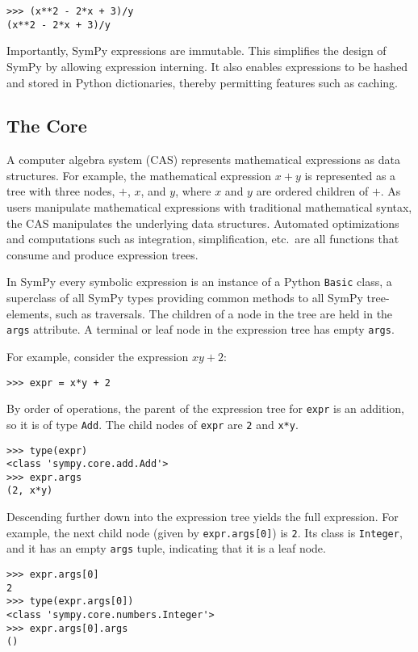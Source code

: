 \begin{verbatim}
>>> (x**2 - 2*x + 3)/y
(x**2 - 2*x + 3)/y
\end{verbatim}

Importantly, SymPy expressions are immutable. This simplifies the design of
SymPy by allowing expression interning. It also enables expressions to be
hashed and stored in Python dictionaries, thereby permitting features
such as caching.


\subsection{The Core}

A computer algebra system (CAS) represents mathematical expressions as data
structures.  For example, the mathematical expression $x + y$ is represented as
a tree with three nodes, $+$, $x$, and $y$, where $x$ and $y$ are ordered
children of $+$.  As users manipulate
mathematical expressions with traditional mathematical syntax, the CAS
manipulates the underlying data structures.  Automated optimizations and
computations such as integration, simplification, etc.\ are all functions that
consume and produce expression trees.

In SymPy every symbolic expression is an instance of a Python \texttt{Basic}
class, a superclass of all SymPy types providing common methods to all SymPy
tree-elements, such as traversals.  The children of a node in the
tree are held in the \texttt{args} attribute.  A terminal or leaf node in the
expression tree has empty \texttt{args}.

For example, consider the expression $xy + 2$:
\begin{verbatim}
>>> expr = x*y + 2
\end{verbatim}
By order of operations, the parent of the expression tree for \texttt{expr} is
an addition, so it is of type \texttt{Add}. The child nodes of \texttt{expr} are
\texttt{2} and \texttt{x*y}.
\begin{verbatim}
>>> type(expr)
<class 'sympy.core.add.Add'>
>>> expr.args
(2, x*y)
\end{verbatim}

Descending further down into the expression tree yields the full expression. For
example, the next child node (given by \texttt{expr.args[0]}) is
\texttt{2}. Its class is \texttt{Integer}, and it has an empty \texttt{args}
tuple, indicating that it is a leaf node.
\begin{verbatim}
>>> expr.args[0]
2
>>> type(expr.args[0])
<class 'sympy.core.numbers.Integer'>
>>> expr.args[0].args
()
\end{verbatim}

